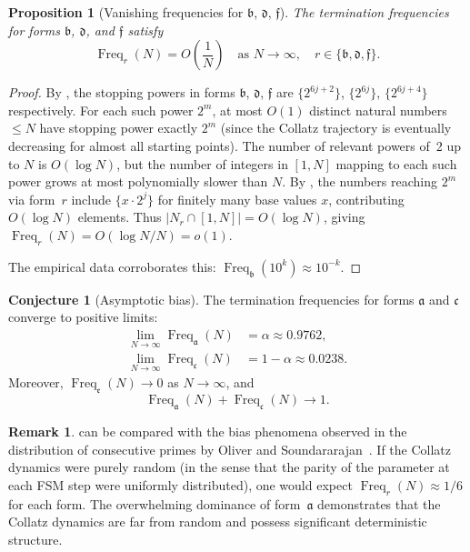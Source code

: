 \documentclass[11pt,a4paper]{article}
\theoremstyle{plain}
\newtheorem{proposition}[theorem]{Proposition}
\theoremstyle{definition}
\newtheorem{remark}[theorem]{Remark}
\newtheorem{conjecture}[theorem]{Conjecture}
\DeclareMathOperator{\Freq}{Freq}
\begin{document}
\begin{proposition}[Vanishing frequencies for $\mathfrak{b}$, $\mathfrak{d}$, $\mathfrak{f}$]\label{prop:vanishing}
  The termination frequencies for forms $\mathfrak{b}$, $\mathfrak{d}$, and $\mathfrak{f}$ satisfy
  \[
    \Freq_r(N) = O\!\left(\frac{1}{N}\right) \quad \text{as } N \to \infty, \quad r \in \{\mathfrak{b}, \mathfrak{d}, \mathfrak{f}\}.
  \]
\end{proposition}

\begin{proof}
  By , the stopping powers in forms $\mathfrak{b}$, $\mathfrak{d}$, $\mathfrak{f}$ are $\{2^{6j+2}\}$, $\{2^{6j}\}$, $\{2^{6j+4}\}$ respectively. For each such power $2^m$, at most $O(1)$ distinct natural numbers $\leq N$ have stopping power exactly $2^m$ (since the Collatz trajectory is eventually decreasing for almost all starting points). The number of relevant powers of~2 up to $N$ is $O(\log N)$, but the number of integers in $[1,N]$ mapping to each such power grows at most polynomially slower than $N$. By , the numbers reaching $2^m$ via form~$r$ include $\{x \cdot 2^j\}$ for finitely many base values $x$, contributing $O(\log N)$ elements. Thus $|N_r \cap [1,N]| = O(\log N)$, giving $\Freq_r(N) = O(\log N / N) = o(1)$.

  The empirical data corroborates this: $\Freq_{\mathfrak{b}}(10^k) \approx 10^{-k}$.
\end{proof}

\begin{conjecture}[Asymptotic bias]\label{conj:bias}
  The termination frequencies for forms $\mathfrak{a}$ and $\mathfrak{c}$ converge to positive limits:
  \begin{align}
    \lim_{N \to \infty} \Freq_{\mathfrak{a}}(N) &= \alpha \approx 0.9762, \label{eq:alpha} \\
    \lim_{N \to \infty} \Freq_{\mathfrak{c}}(N) &= 1 - \alpha \approx 0.0238. \label{eq:beta}
  \end{align}
  Moreover, $\Freq_{\mathfrak{e}}(N) \to 0$ as $N \to \infty$, and
  \[
    \Freq_{\mathfrak{a}}(N) + \Freq_{\mathfrak{c}}(N) \to 1.
  \]
\end{conjecture}

\begin{remark}
   can be compared with the bias phenomena observed in the distribution of consecutive primes by Oliver and Soundararajan~\cite{oliver2016}. If the Collatz dynamics were purely random (in the sense that the parity of the parameter at each FSM step were uniformly distributed), one would expect $\Freq_r(N) \approx 1/6$ for each form. The overwhelming dominance of form~$\mathfrak{a}$ demonstrates that the Collatz dynamics are far from random and possess significant deterministic structure.
\end{remark}
\end{document}
